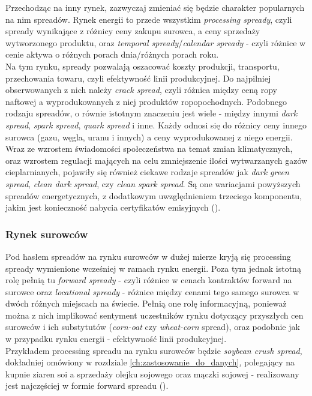 Przechodząc na inny rynek, zazwyczaj zmieniać się będzie charakter popularnych na nim spreadów. Rynek energii to przede wszystkim \emph{processing spready}, czyli spready wynikające z różnicy ceny zakupu surowca, a ceny sprzedaży wytworzonego produktu, oraz \emph{temporal spready}/\emph{calendar spready} - czyli różnice w cenie aktywa o różnych porach dnia/różnych porach roku.\\
Na tym rynku, spready pozwalają oszacować koszty produkcji, transportu, przechowania towaru, czyli efektywność linii produkcyjnej. Do najpilniej obserwowanych z nich należy \emph{crack spread}, czyli różnica między ceną ropy naftowej a wyprodukowanych z niej produktów ropopochodnych. Podobnego rodzaju spreadów, o równie istotnym znaczeniu jest wiele - między innymi \emph{dark spread}, \emph{spark spread}, \emph{quark spread} i inne. Każdy odnosi się do różnicy ceny innego surowca (gazu, węgla, uranu i innych) a ceny wyprodukowanej z niego energii.\\
Wraz ze wzrostem świadomości społeczeństwa na temat zmian klimatycznych, oraz wzrostem regulacji mających na celu zmniejszenie ilości wytwarzanych gazów cieplarnianych, pojawiły się również ciekawe rodzaje spreadów jak \emph{dark green spread}, \emph{clean dark spread}, czy \emph{clean spark spread}. Są one wariacjami powyższych spreadów energetycznych, z dodatkowym uwzględnieniem trzeciego komponentu, jakim jest konieczność nabycia certyfikatów emisyjnych (\cite{Carmona_Clean_Spreads}).

\subsubsection{Rynek surowców}

Pod hasłem spreadów na rynku surowców w dużej mierze kryją się processing spready wymienione wcześniej w ramach rynku energii. Poza tym jednak istotną rolę pełnią tu \emph{forward spready} - czyli różnice w cenach kontraktów forward na surowce oraz \emph{locational spready} - różnice między cenami tego samego surowca w dwóch różnych miejscach na świecie. Pełnią one rolę informacyjną, ponieważ można z nich implikować sentyment uczestników rynku dotyczący przyszłych cen surowców i ich substytutów (\emph{corn-oat} czy \emph{wheat-corn} spread), oraz podobnie jak w przypadku rynku energii - efektywność linii produkcyjnej.\\
Przykładem processing spreadu na rynku surowców będzie \emph{soybean crush spread}, dokładniej omówiony w rozdziale \ref{ch:zastosowanie_do_danych}, polegający na kupnie ziaren soi a sprzedaży olejku sojowego oraz mączki sojowej - realizowany jest najczęściej w formie forward spreadu (\cite{Agro_Spreads}).